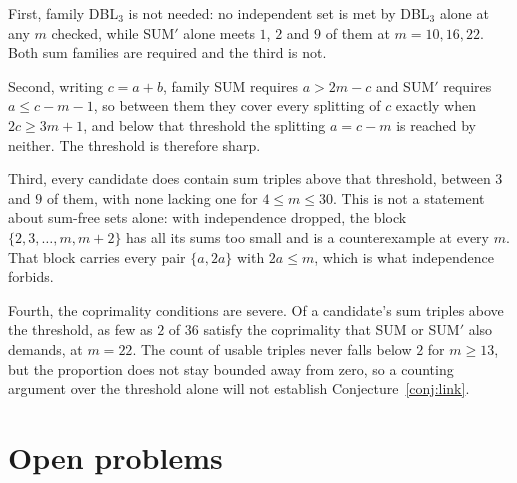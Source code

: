 \documentclass[11pt]{amsart}
\theoremstyle{plain}
\theoremstyle{definition}
\begin{document}
First, family DBL$_3$ is not needed: no independent set is met by DBL$_3$ alone at any $m$ checked,
while SUM$'$ alone meets $1$, $2$ and $9$ of them at $m = 10, 16, 22$. Both sum families are
required and the third is not.

Second, writing $c = a+b$, family SUM requires $a > 2m - c$ and SUM$'$ requires $a \le c-m-1$, so
between them they cover every splitting of $c$ exactly when $2c \ge 3m+1$, and below that threshold
the splitting $a = c-m$ is reached by neither. The threshold is therefore sharp.

Third, every candidate does contain sum triples above that threshold, between $3$ and $9$ of them,
with none lacking one for $4 \le m \le 30$. This is not a statement about sum-free sets alone: with
independence dropped, the block $\{2,3,\dots,m,m+2\}$ has all its sums too small and is a
counterexample at every $m$. That block carries every pair $\{a,2a\}$ with $2a \le m$, which is what
independence forbids.

Fourth, the coprimality conditions are severe. Of a candidate's sum triples above the threshold, as
few as $2$ of $36$ satisfy the coprimality that SUM or SUM$'$ also demands, at $m = 22$. The count
of usable triples never falls below $2$ for $m \ge 13$, but the proportion does not stay bounded
away from zero, so a counting argument over the threshold alone will not establish
Conjecture~\ref{conj:link}.

\section{Open problems}\label{sec:open}
\end{document}
